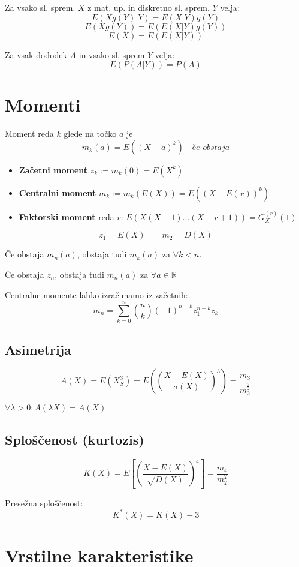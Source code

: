 \begin{multicols}{5}
Za vsako sl. sprem. $X$ z mat. up. in diskretno sl. sprem. $Y$ velja:
\[ E(Xg(Y) | Y) = E(X | Y)g(Y) \]
\[ E(Xg(Y)) = E(E(X | Y)g(Y)) \]
\[ E(X) = E(E(X|Y))\]

Za vsak dododek $A$ in vsako sl. sprem $Y$ velja:
\[ E(P(A|Y)) = P(A)\]


\section{Momenti}
Moment reda $k$ glede na točko $a$ je
\[ m_k(a) = E((X-a)^k) \quad \textit{če obstaja}\]

\begin{itemize}
    \item \textbf{Začetni moment} $z_k := m_k(0) = E(X^k)$
    \item \textbf{Centralni moment} $m_k := m_k(E(X)) = E((X-E(x))^k)$
    \item \textbf{Faktorski moment} reda $r$: $E(X(X-1)\dots (X-r+1)) = G_X^{(r)}(1)$
\end{itemize}

\[ z_1 = E(X) \qquad m_2 = D(X)\]

Če obstaja $m_n(a)$, obstaja tudi $m_k(a)$ za $\forall k < n$.

Če obstaja $z_n$, obstaja tudi $m_n(a)$ za $\forall a \in \mathbb{R}$

Centralne momente lahko izračunamo iz začetnih:
\[ m_n = \sum_{k=0}^n \binom{n}{k} (-1)^{n-k} z_1^{n-k} z_k \]

\subsection{Asimetrija}
\[A(X) = E(X_S^3) = E\left( (\frac{X-E(X)}{\sigma(X)})^3 \right) = \frac{m_3}{m_2^{\frac{3}{2}}}\]

$\forall \lambda > 0: A(\lambda X) = A(X)$

\subsection{Sploščenost (kurtozis)}
\[ K(X) = E\left[ \left( \frac{X-E(X)}{\sqrt{D(X)}}\right)^4\right] = \frac{m_4}{m_2^2}\]

Presežna sploščenost:
\[ K^*(X) = K(X) - 3\]

\section{Vrstilne karakteristike}


\end{multicols}
